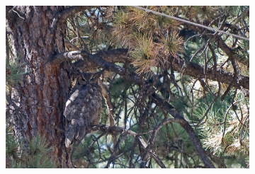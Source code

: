 \documentclass[a4paper,12pt]{ctexart}
\begin{document}
\begin{figure}[h]
    \centering
    \begin{subfigure}{0.4\textwidth}
        \centering
        \includegraphics[width=\linewidth]{figures/COD10K_demo1/COD10K_demo1_ori.png}
    \end{subfigure} \\


\end{figure}
\end{document}

